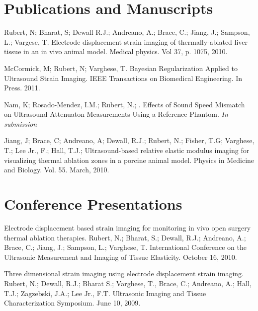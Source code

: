 \documentclass[margin,line]{res}
\begin{document}
\begin{resume}
\section{\sc Publications and Manuscripts}

Rubert, N; Bharat, S; Dewall R.J.; Andreano, A.; Brace, C.; Jiang, J.; Sampson, L.; Vargese, T.  Electrode displacement strain imaging of thermally-ablated liver tissue in an in vivo animal model.  Medical physics. Vol 37, p. 1075, 2010.

McCormick, M; Rubert, N; Varghese, T. Bayesian Regularization Applied to
Ultrasound Strain Imaging. IEEE Transactions on Biomedical Engineering.
In Press. 2011.

Nam, K; Rosado-Mendez, I.M.; Rubert, N.; .  Effects of Sound Speed Mismatch on Ultrasound Attenuaton Measurements Using a Reference Phantom.  	{\it In submission}

Jiang, J; Brace, C; Andreano, A; Dewall, R.J.; Rubert, N.; Fisher, T.G; Varghese, T.; Lee Jr., F.; Hall, T.J.;  Ultrasound-based relative elastic modulus imaging for visualizing thermal ablation zones in a porcine animal model.  Physics in Medicine and Biology.  Vol. 55.  March, 2010.


\section{\sc Conference Presentations}

Electrode displacement based strain imaging for monitoring in vivo open surgery thermal ablation therapies.  Rubert, N.; Bharat, S.; Dewall, R.J.; Andreano, A.; Brace, C.; Jiang, J.; Sampson, L.; Varghese, T. International Conference on the Ultrasonic Measurement and Imaging of Tissue Elasticity.  October 16, 2010.

Three dimensional strain imaging using electrode displacement strain imaging. Rubert, N.; Dewall, R.J.; Bharat S.; Varghese, T., Brace, C.; Andreano, A.; Hall, T.J.; Zagzebski, J.A.; Lee Jr., F.T.  Ultrasonic Imaging and Tissue Characterization Symposium.  June 10, 2009.

\end{resume}
\end{document}

